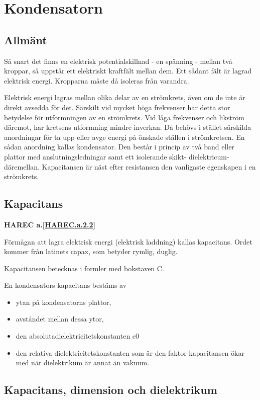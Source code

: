 \section{Kondensatorn}

\subsection{Allmänt}

Så snart det finns en elektrisk potentialskillnad - en spänning - mellan två kroppar, så
uppstår ett elektriskt kraftfält mellan dem. Ett sådant fält är lagrad elektrisk energi.
Kropparna måste då isoleras från varandra.

Elektrisk energi lagras mellan olika delar av en strömkrets, även om de inte är direkt
avsedda för det. Särskilt vid mycket höga frekvenser har detta stor betydelse för
utformningen av en strömkrets. Vid låga frekvenser och likström däremot, har kretsens
utformning mindre inverkan. Då behövs i stället särskilda anordningar för ta upp eller
avge energi på önskade ställen i strömkretsen. En sådan anordning kallas kondensator.
Den består i princip av två band eller plattor
med anslutningsledningar samt ett isolerande skikt- dielektricum- däremellan.
Kapacitansen är näst efter resistansen den vanligaste egenskapen i en strömkrets.

\subsection{Kapacitans}
\textbf{HAREC a.\ref{HAREC.a.2.2}\label{myHAREC.a.2.2}}

Förmågan att lagra elektrisk energi (elektrisk laddning) kallas kapacitans.
Ordet kommer från latinets capax, som betyder rymlig, duglig.

Kapacitansen betecknas i formler med
bokstaven C.

En kondensators kapacitans bestäms av
\begin{itemize}
  \item ytan på kondensatorns plattor,
  \item avståndet mellan dessa ytor,
  \item den absolutadielektricitetskonstanten c0
  \item den relativa dielektricitetskonstanten som är den faktor kapacitansen ökar med när dielektrikum är annat än vakuum.
\end{itemize}

\subsection{Kapacitans, dimension och dielektrikum}

